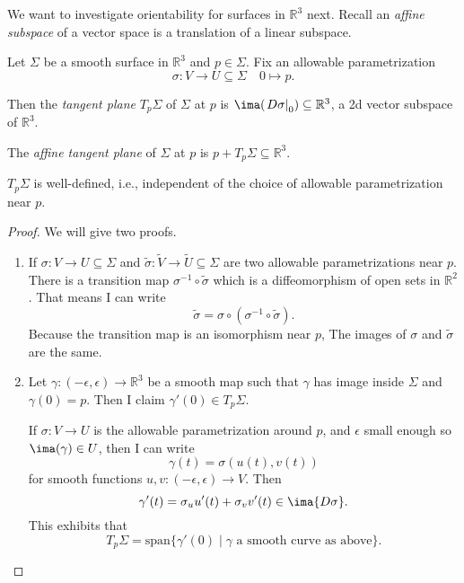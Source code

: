 We want to investigate orientability for surfaces in \(\mathbb{R}^3\) next. Recall an \textit{affine subspace} of a vector space is a translation of a linear subspace.
\begin{definition}{}{}
    Let \(\Sigma\) be a smooth surface in \(\mathbb{R}^3\) and \(p \in \Sigma\). Fix an allowable parametrization
    \[
        \sigma: V \to U \subseteq \Sigma \quad 0 \mapsto p.
    \]

    Then the \textit{tangent plane} \(T_p\Sigma\) of \(\Sigma\) at \(p\) is \(\ima(\left.D\sigma\right|_0) \subseteq \mathbb{R}^3\), a 2d vector subspace of \(\mathbb{R}^3\).

    The \textit{affine tangent plane} of \(\Sigma\) at \(p\) is \(p + T_p\Sigma \subseteq \mathbb{R}^3\).
\end{definition}
\begin{lemma}{}{}
    \(T_p\Sigma\) is well-defined, i.e., independent of the choice of allowable parametrization near \(p\).
\end{lemma}
\begin{proof}
    We will give two proofs.
    \begin{enumerate}
        \item If \(\sigma: V \to U \subseteq \Sigma\) and \(\tilde{\sigma}: \tilde{V} \to \tilde{U} \subseteq \Sigma\) are two allowable parametrizations near \(p\). There is a transition map \(\sigma^{-1}\circ \tilde{\sigma}\) which is a diffeomorphism of open sets in \(\mathbb{R}^2\). That means I can write
        \[
            \tilde{\sigma} = \sigma\circ (\sigma^{-1}\circ \tilde{\sigma}).
        \]
        Because the transition map is an isomorphism near \(p\), The images of \(\sigma\) and \(\tilde{\sigma}\) are the same.
        \item Let \(\gamma: (-\epsilon, \epsilon) \to \mathbb{R}^3\) be a smooth map such that \(\gamma\) has image inside \(\Sigma\) and \(\gamma(0) = p\). Then I claim \(\gamma'(0) \in T_p\Sigma\).

        If \(\sigma: V \to U\) is the allowable parametrization around \(p\), and \(\epsilon\) small enough so \(\ima(\gamma)\in U\), then I can write
        \[
            \gamma(t) = \sigma(u(t), v(t))
        \]
        for smooth functions \(u, v: (-\epsilon, \epsilon)\to V\). Then
        \[\gamma'(t)= \sigma_u u'(t) + \sigma_v v'(t) \in \ima{D\sigma}.\]
        This exhibits that
        \[
            T_{p}\Sigma = \mathrm{span}\{\gamma'(0)\mid \gamma \text{ a smooth curve as above}\}.
        \]
    \end{enumerate}
\end{proof}

